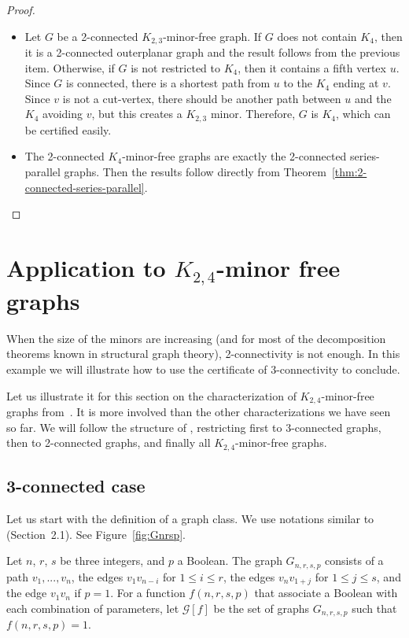 \documentclass[a4paper,thm-restate,USenglish]{lipics-v2019}
\begin{document}
\begin{proof}
\begin{itemize}
    \item Let $G$ be a 2-connected $K_{2,3}$-minor-free graph. If $G$ does not contain $K_4$, then it is a 2-connected outerplanar graph and the result follows from the previous item. Otherwise, if $G$ is not restricted to $K_4$, then it contains a fifth vertex $u$. Since $G$ is connected, there is a shortest path from $u$ to the $K_4$ ending at $v$. Since $v$ is not a cut-vertex, there should be another path between $u$ and the $K_4$ avoiding $v$, but this creates a $K_{2,3}$ minor. Therefore, $G$ is $K_4$, which can be certified easily.
    \item The 2-connected $K_4$-minor-free graphs are exactly the 2-connected series-parallel graphs. Then the results follow directly from Theorem~\ref{thm:2-connected-series-parallel}.\qedhere
\end{itemize}
\end{proof}

\section{Application to $K_{2,4}$-minor free graphs}
\label{sec:K24}

When the size of the minors are increasing (and for most of the decomposition theorems known in structural graph theory), 2-connectivity is not enough. In this example we will illustrate how to use the certificate of $3$-connectivity to conclude.

Let us illustrate it for this section on the characterization of $K_{2,4}$-minor-free graphs from~\cite{EllinghamMOT16}. 
It is more involved than the other characterizations we have seen so far. 
We will follow the structure of \cite{EllinghamMOT16}, restricting first to 3-connected graphs, then to 2-connected graphs, and finally all $K_{2,4}$-minor-free graphs. 

\subsection{3-connected case}

Let us start with the definition of a graph class. We use notations similar to \cite{EllinghamMOT16} (Section~2.1). See Figure~\ref{fig:Gnrsp}.

\begin{definition}\label{def:Gnrsp}
Let $n$, $r$, $s$ be  three integers, and $p$ a Boolean. The graph $G_{n,r,s,p}$ consists of 
a path  $v_1,...,v_n$, 
the edges $v_1v_{n-i}$ for $1\leq i\leq r$, 
the edges $v_nv_{1+j}$ for $1\leq j\leq s$, 
and the edge $v_1v_n$ if $p=1$. 
For a function $f(n,r,s,p)$ that associate a Boolean with each combination of parameters, let $\mathcal{G}[f]$ be the set of graphs $G_{n,r,s,p}$ such that $f(n,r,s,p)=1$.
\end{definition}
\end{document}
